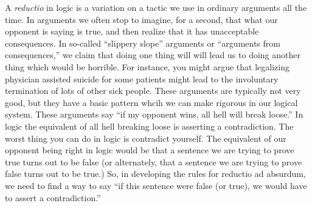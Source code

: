 A \emph{reductio} in logic is a variation on a tactic we use in ordinary arguments all the time. In arguments we often stop to imagine, for a second, that what our opponent is saying is true, and then realize that it has unacceptable consequences. In so-called ``slippery slope'' arguments or ``arguments from consequences,'' we claim that doing one thing will will lead us to doing another thing which would be horrible. For instance, you might argue that legalizing physician assisted suicide for some patients might lead to the involuntary termination of lots of other sick people. These arguments are typically not very good, but they have a basic pattern whcih we can make rigorous  in our logical system. These arguments say ``if my opponent wins, all hell will break loose.'' In logic the equivalent of all hell breaking loose is asserting a contradiction. The worst thing you can do in logic is contradict yourself. The equivalent of our opponent being right in logic would be that a sentence we are trying to prove true turns out to be false (or alternately, that a sentence we are trying to prove false turns out to be true.) So, in developing the rules for reductio ad absurdum, we need to find a way to say ``if this sentence were false (or true), we would have to assert a contradiction.'' 

%

